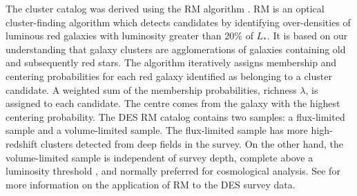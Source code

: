 The cluster catalog was derived using the RM algorithm \citep{rykoff14}.
RM is an optical cluster-finding algorithm which detects candidates by identifying over-densities of luminous red galaxies with luminosity greater than 20\% of $L_{*}.$
It is based on our understanding that galaxy clusters are agglomerations of galaxies containing old and subsequently red stars. 
The algorithm iteratively assigns membership and centering probabilities for each red galaxy identified as belonging to a cluster candidate. 
A weighted sum of the membership probabilities, richness $\lambda$, is assigned to each candidate.
The centre comes from the galaxy with the highest centering probability.
The DES RM catalog contains two samples: a flux-limited sample and a volume-limited sample. 
The flux-limited sample has more high-redshift clusters detected from deep fields in the survey. 
On the other hand, the volume-limited sample is independent of survey depth, complete above a luminosity threshold \citep[hereafter ]{mcclintock18}, and normally preferred for cosmological analysis.
See \citet{rykoff16} for more information on the application of RM to the DES survey data.


